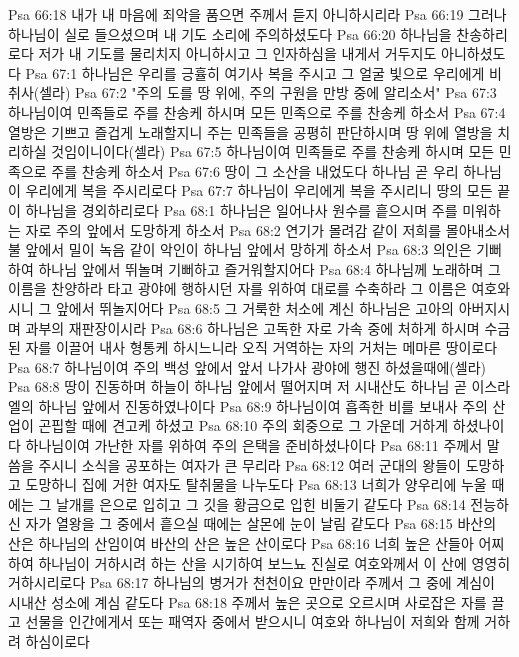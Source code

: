 Psa 66:18  내가 내 마음에 죄악을 품으면 주께서 듣지 아니하시리라
Psa 66:19  그러나 하나님이 실로 들으셨으며 내 기도 소리에 주의하셨도다
Psa 66:20  하나님을 찬송하리로다 저가 내 기도를 물리치지 아니하시고 그 인자하심을 내게서 거두지도 아니하셨도다
Psa 67:1  하나님은 우리를 긍휼히 여기사 복을 주시고 그 얼굴 빛으로 우리에게 비취사(셀라)
Psa 67:2  "주의 도를 땅 위에, 주의 구원을 만방 중에 알리소서"
Psa 67:3  하나님이여 민족들로 주를 찬송케 하시며 모든 민족으로 주를 찬송케 하소서
Psa 67:4  열방은 기쁘고 즐겁게 노래할지니 주는 민족들을 공평히 판단하시며 땅 위에 열방을 치리하실 것임이니이다(셀라)
Psa 67:5  하나님이여 민족들로 주를 찬송케 하시며 모든 민족으로 주를 찬송케 하소서
Psa 67:6  땅이 그 소산을 내었도다 하나님 곧 우리 하나님이 우리에게 복을 주시리로다
Psa 67:7  하나님이 우리에게 복을 주시리니 땅의 모든 끝이 하나님을 경외하리로다
Psa 68:1  하나님은 일어나사 원수를 흩으시며 주를 미워하는 자로 주의 앞에서 도망하게 하소서
Psa 68:2  연기가 몰려감 같이 저희를 몰아내소서 불 앞에서 밀이 녹음 같이 악인이 하나님 앞에서 망하게 하소서
Psa 68:3  의인은 기뻐하여 하나님 앞에서 뛰놀며 기뻐하고 즐거워할지어다
Psa 68:4  하나님께 노래하며 그 이름을 찬양하라 타고 광야에 행하시던 자를 위하여 대로를 수축하라 그 이름은 여호와시니 그 앞에서 뛰놀지어다
Psa 68:5  그 거룩한 처소에 계신 하나님은 고아의 아버지시며 과부의 재판장이시라
Psa 68:6  하나님은 고독한 자로 가속 중에 처하게 하시며 수금된 자를 이끌어 내사 형통케 하시느니라 오직 거역하는 자의 거처는 메마른 땅이로다
Psa 68:7  하나님이여 주의 백성 앞에서 앞서 나가사 광야에 행진 하셨을때에(셀라)
Psa 68:8  땅이 진동하며 하늘이 하나님 앞에서 떨어지며 저 시내산도 하나님 곧 이스라엘의 하나님 앞에서 진동하였나이다
Psa 68:9  하나님이여 흡족한 비를 보내사 주의 산업이 곤핍할 때에 견고케 하셨고
Psa 68:10  주의 회중으로 그 가운데 거하게 하셨나이다 하나님이여 가난한 자를 위하여 주의 은택을 준비하셨나이다
Psa 68:11  주께서 말씀을 주시니 소식을 공포하는 여자가 큰 무리라
Psa 68:12  여러 군대의 왕들이 도망하고 도망하니 집에 거한 여자도 탈취물을 나누도다
Psa 68:13  너희가 양우리에 누울 때에는 그 날개를 은으로 입히고 그 깃을 황금으로 입힌 비둘기 같도다
Psa 68:14  전능하신 자가 열왕을 그 중에서 흩으실 때에는 살몬에 눈이 날림 같도다
Psa 68:15  바산의 산은 하나님의 산임이여 바산의 산은 높은 산이로다
Psa 68:16  너희 높은 산들아 어찌하여 하나님이 거하시려 하는 산을 시기하여 보느뇨 진실로 여호와께서 이 산에 영영히 거하시리로다
Psa 68:17  하나님의 병거가 천천이요 만만이라 주께서 그 중에 계심이 시내산 성소에 계심 같도다
Psa 68:18  주께서 높은 곳으로 오르시며 사로잡은 자를 끌고 선물을 인간에게서 또는 패역자 중에서 받으시니 여호와 하나님이 저희와 함께 거하려 하심이로다
